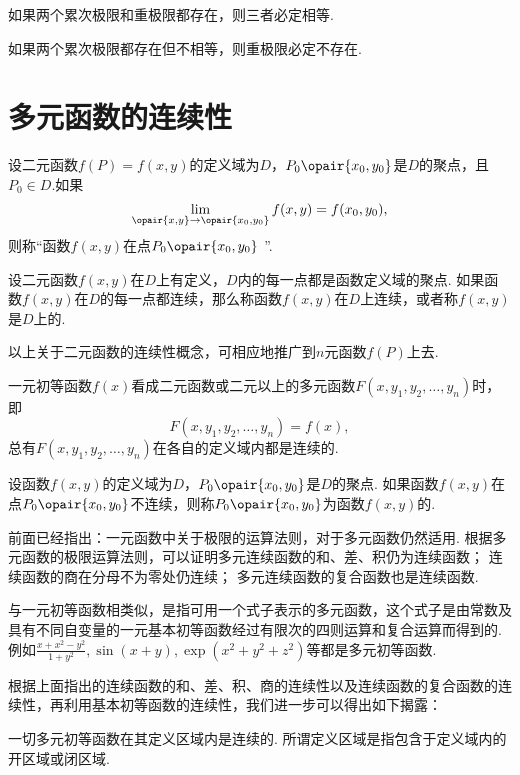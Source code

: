 \begin{corollary}
如果两个累次极限和重极限都存在，则三者必定相等.
\end{corollary}

\begin{corollary}
如果两个累次极限都存在但不相等，则重极限必定不存在.
\end{corollary}

\section{多元函数的连续性}
\begin{definition}
设二元函数\(f(P)=f(x,y)\)的定义域为\(D\)，\(P_0\opair{x_0,y_0}\)是\(D\)的聚点，且\(P_0 \in D\).如果\[
\lim\limits_{\opair{x,y}\to\opair{x_0,y_0}} f(x,y) = f(x_0,y_0),
\]则称“函数\(f(x,y)\)在点\(P_0\opair{x_0,y_0}\) ”.

设二元函数\(f(x,y)\)在\(D\)上有定义，\(D\)内的每一点都是函数定义域的聚点.
如果函数\(f(x,y)\)在\(D\)的每一点都连续，那么称函数\(f(x,y)\)在\(D\)上连续，或者称\(f(x,y)\)是\(D\)上的.
\end{definition}
以上关于二元函数的连续性概念，可相应地推广到\(n\)元函数\(f(P)\)上去.

一元初等函数\(f(x)\)看成二元函数或二元以上的多元函数\(F(x,y_1,y_2,\dotsc,y_n)\)时，即\[
F(x,y_1,y_2,\dotsc,y_n) = f(x),
\]总有\(F(x,y_1,y_2,\dotsc,y_n)\)在各自的定义域内都是连续的.

\begin{definition}
设函数\(f(x,y)\)的定义域为\(D\)，\(P_0\opair{x_0,y_0}\)是\(D\)的聚点.
如果函数\(f(x,y)\)在点\(P_0\opair{x_0,y_0}\)不连续，则称\(P_0\opair{x_0,y_0}\)为函数\(f(x,y)\)的.
\end{definition}

前面已经指出：一元函数中关于极限的运算法则，对于多元函数仍然适用.
根据多元函数的极限运算法则，可以证明多元连续函数的和、差、积仍为连续函数；
连续函数的商在分母不为零处仍连续；
多元连续函数的复合函数也是连续函数.

与一元初等函数相类似，是指可用一个式子表示的多元函数，这个式子是由常数及具有不同自变量的一元基本初等函数经过有限次的四则运算和复合运算而得到的.
例如\(\frac{x+x^2-y^2}{1+y^2},\sin(x+y),\exp(x^2+y^2+z^2)\)等都是多元初等函数.

根据上面指出的连续函数的和、差、积、商的连续性以及连续函数的复合函数的连续性，再利用基本初等函数的连续性，我们进一步可以得出如下揭露：

一切多元初等函数在其定义区域内是连续的.
所谓定义区域是指包含于定义域内的开区域或闭区域.

